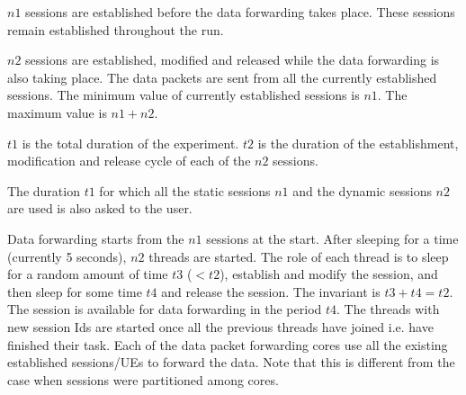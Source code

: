 $n1$ sessions are established before the data forwarding takes place. These sessions remain established throughout the run.

$n2$ sessions are established, modified and released while the data forwarding is also taking place. The data packets are sent from all the currently established sessions. The minimum value of currently established sessions is $n1$. The maximum value is $n1+n2$.

$t1$ is the total duration of the experiment.
$t2$ is the  duration of the establishment, modification and release cycle of each of the $n2$ sessions.

The duration $t1$ for which all the static sessions $n1$ and the dynamic sessions $n2$ are used is also asked to the user.

Data forwarding starts from the $n1$ sessions at the start. After sleeping for a time (currently 5
seconds), $n2$ threads are started. The role of each thread is to sleep for a random amount of time
$t3$ ($<t2$), establish and modify the session, and then sleep for some time $t4$ and release the
session. The invariant is $t3+t4= t2$.  The session is available for data forwarding in the period $t4$.  The threads with new session Ids are started once all the previous threads have joined i.e. have finished their task.
Each of the data packet forwarding cores use all the existing established sessions/UEs to forward the data. Note that this is different from the case when sessions were partitioned among cores.
